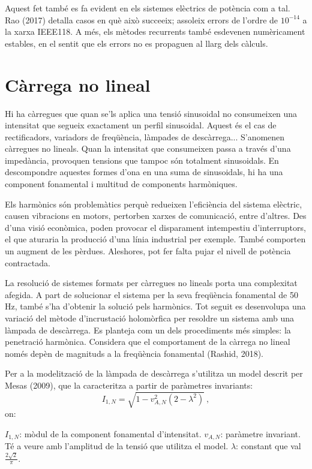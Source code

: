 Aquest fet també es fa evident en els sistemes elèctrics de potència com a tal. Rao (2017) detalla casos en què això succeeix; assoleix errors de l'ordre de $10^{-14}$ a la xarxa IEEE118. A més, els mètodes recurrents també esdevenen numèricament estables, en el sentit que els errors no es propaguen al llarg dels càlculs.

\section{Càrrega no lineal}
Hi ha càrregues que quan se'ls aplica una tensió sinusoidal no consumeixen una intensitat que segueix exactament un perfil sinusoidal. Aquest és el cas de rectificadors, variadors de freqüència, làmpades de descàrrega... S'anomenen càrregues no lineals. Quan la intensitat que consumeixen passa a través d'una impedància, provoquen tensions que tampoc són totalment sinusoidals. En descompondre aquestes formes d'ona en una suma de sinusoidals, hi ha una component fonamental i multitud de components harmòniques.

Els harmònics són problemàtics perquè redueixen l'eficiència del sistema elèctric, causen vibracions en motors, pertorben xarxes de comunicació, entre d'altres. Des d'una visió econòmica, poden provocar el disparament intempestiu d'interruptors, el que aturaria la producció d'una línia industrial per exemple. També comporten un augment de les pèrdues. Aleshores, pot fer falta pujar el nivell de potència contractada. 

La resolució de sistemes formats per càrregues no lineals porta una complexitat afegida. A part de solucionar el sistema per la seva freqüència fonamental de 50 Hz, també s'ha d'obtenir la solució pels harmònics. Tot seguit es desenvolupa una variació del mètode d'incrustació holomòrfica per resoldre un sistema amb una làmpada de descàrrega. Es planteja com un dels procediments més simples: la penetració harmònica. Considera que el comportament de la càrrega no lineal només depèn de magnituds a la freqüència fonamental (Rashid, 2018). 

Per a la modelització de la làmpada de descàrrega s'utilitza un model descrit per Mesas (2009), que la caracteritza a partir de paràmetres invariants:
\begin{equation}
    I_{1,N}=\sqrt{1-v^2_{A,N}(2-\lambda^2)}\ ,
    \label{eq:NL1}
\end{equation}
on:

$I_{1,N}$: mòdul de la component fonamental d'intensitat. 
\vs 
$v_{A,N}$: paràmetre invariant. Té a veure amb l'amplitud de la tensió que utilitza el model.
\vs
$\lambda$: constant que val $\frac{2\sqrt{2}}{\pi}$.

